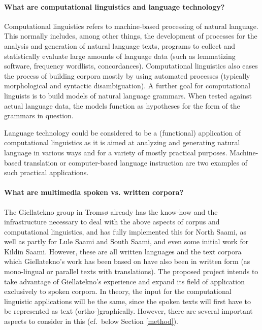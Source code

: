 \documentclass[a4paper,12pt]{article}
\begin{document}
\paragraph{What are computational linguistics and language technology?} Computational linguistics refers to machine-based processing of natural language. This normally includes, among other things, the development of processes for the analysis and generation of natural language texts, programs to collect and statistically evaluate large amounts of language data (such as lemmatizing software, frequency wordlists, concordances). Computational linguistics also eases the process of building corpora mostly by using automated processes (typically morphological and syntactic disambiguation). A further goal for computational linguists is to build models of natural language grammars. When tested against actual language data, the models function as hypotheses for the form of the grammars in question. 

Language technology could be considered to be a (functional) application of computational linguistics as it is aimed at analyzing and generating natural language in various ways and for a variety of mostly practical purposes. Machine-based translation or computer-based language instruction are two examples of such practical applications.
 
\paragraph{What are multimedia spoken vs. written corpora?}
The Giellatekno group in Tromsø already has the know-how and the infrastructure necessary to deal with the above aspects of corpus and computational linguistics, and has fully implemented this for North Saami, as well as partly for Lule Saami and South Saami, and even some initial work for Kildin Saami. However, these are all written languages and the text corpora which Giellatekno's work has been based on have also been in written form (as mono-lingual or parallel texts with translations). The proposed project intends to take advantage of Giellatekno's experience and expand its field of application exclusively to spoken corpora. In theory, the input for the computational linguistic applications will be the same, since the spoken texts will first have to be represented as text (ortho-)graphically. However, there are several important aspects to consider in this (cf.~below Section \ref{method}).
\end{document}
